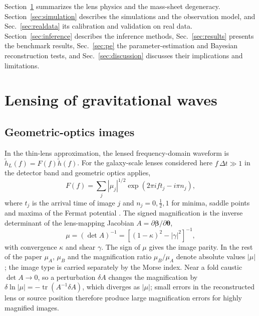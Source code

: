 Section~\ref{sec:physics} summarizes the lens physics and the mass-sheet degeneracy. Section~\ref{sec:simulation} describes the simulations and the observation model, and Sec.~\ref{sec:realdata} its calibration and validation on real data. Section~\ref{sec:inference} describes the inference methods, Sec.~\ref{sec:results} presents the benchmark results, Sec.~\ref{sec:pe} the parameter-estimation and Bayesian reconstruction tests, and Sec.~\ref{sec:discussion} discusses their implications and limitations.

\section{Lensing of gravitational waves}
\label{sec:physics}
\subsection{Geometric-optics images}
In the thin-lens approximation, the lensed frequency-domain waveform is $\tilde h_L(f)=F(f)\tilde h(f)$. For the galaxy-scale lenses considered here $f\,\Delta t\gg1$ in the detector band and geometric optics applies,
\begin{equation}
F(f)=\sum_j |\mu_j|^{1/2}\exp\left(2\pi i f t_j-i\pi n_j\right),
\label{eq:go}
\end{equation}
where $t_j$ is the arrival time of image $j$ and $n_j=0,\tfrac12,1$ for minima, saddle points and maxima of the Fermat potential \citep{schneider1992gravitationallenses,takahashi2003waveeffects,dai2017morse}. The signed magnification is the inverse determinant of the lens-mapping Jacobian $A=\partial\boldsymbol\beta/\partial\boldsymbol\theta$,
\begin{equation}
\mu=\left(\det A\right)^{-1}=\left[(1-\kappa)^2-|\gamma|^2\right]^{-1},
\label{eq:jacobian}
\end{equation}
with convergence $\kappa$ and shear $\gamma$. The sign of $\mu$ gives the image parity. In the rest of the paper $\mu_A$, $\mu_B$ and the magnification ratio $\mu_B/\mu_A$ denote absolute values $|\mu|$; the image type is carried separately by the Morse index. Near a fold caustic $\det A\to0$, so a perturbation $\delta A$ changes the magnification by $\delta\ln|\mu|=-\operatorname{tr}(A^{-1}\delta A)$, which diverges as $|\mu|$; small errors in the reconstructed lens or source position therefore produce large magnification errors for highly magnified images.

